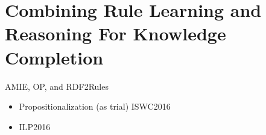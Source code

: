 \section{Combining Rule Learning and Reasoning For Knowledge Completion}
\label{sec:rules_kg_completion}



AMIE, OP, and RDF2Rules

\begin{itemize}
\item Propositionalization (as trial) ISWC2016
\item ILP2016

\end{itemize}


